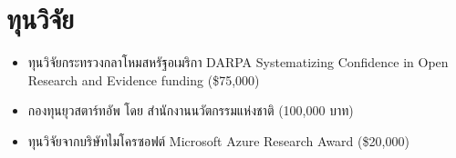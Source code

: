 \section{\sc ทุนวิจัย}

\begin{itemize}[leftmargin=0cm, label={}]
\itemsep0em

\item ทุนวิจัยกระทรวงกลาโหมสหรัฐอเมริกา DARPA Systematizing Confidence in Open Research and Evidence funding (\$75,000)

\item กองทุนยุวสตาร์ทอัพ โดย สำนักงานนวัตกรรมแห่งชาติ (100,000 บาท)

\item ทุนวิจัยจากบริษัทไมโครซอฟต์ Microsoft Azure Research Award (\$20,000)

\end{itemize}
